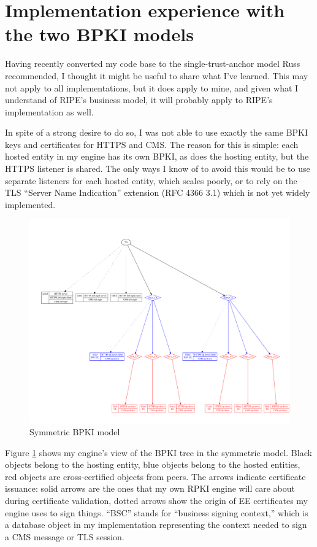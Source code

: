 \documentclass[11pt]{article}
\begin{document}
\section*{Implementation experience with the two BPKI models}

Having recently converted my code base to the single-trust-anchor
model Russ recommended, I thought it might be useful to share what
I've learned.  This may not apply to all implementations, but it does
apply to mine, and given what I understand of RIPE's business model,
it will probably apply to RIPE's implementation as well.

In spite of a strong desire to do so, I was not able to use exactly
the same BPKI keys and certificates for HTTPS and CMS.  The reason for
this is simple: each hosted entity in my engine has its own BPKI, as
does the hosting entity, but the HTTPS listener is shared.  The only
ways I know of to avoid this would be to use separate listeners for
each hosted entity, which scales poorly, or to rely on the TLS
``Server Name Indication'' extension (RFC 4366 3.1) which is not yet
widely implemented.

\begin{figure}[hbp]
\includegraphics[width = 6.5in]{bpki-symmetric}
\caption{Symmetric BPKI model}
\label{bpki-symmetric}
\end{figure}

Figure \ref{bpki-symmetric} shows my engine's view of the BPKI tree in
the symmetric model.  Black objects belong to the hosting entity, blue
objects belong to the hosted entities, red objects are cross-certified
objects from peers.  The arrows indicate certificate issuance: solid
arrows are the ones that my own RPKI engine will care about during
certificate validation, dotted arrows show the origin of EE
certificates my engine uses to sign things.  ``BSC'' stands for
``business signing context,'' which is a database object in my
implementation representing the context needed to sign a CMS message
or TLS session.
\end{document}
